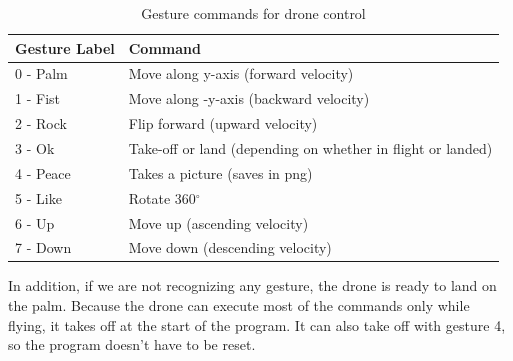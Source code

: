 \begin{table}[ht]
\centering
\begin{tabular}{ll}
\toprule
Gesture Label & Command \\
\midrule
0 - Palm& Move along y-axis (forward velocity) \\
1 - Fist& Move along -y-axis (backward velocity) \\
2 - Rock& Flip forward (upward velocity) \\
3 - Ok & Take-off or land (depending on whether in flight or landed) \\
4 - Peace& Takes a picture (saves in png) \\
5 - Like& Rotate 360$^\circ$ \\
6 - Up& Move up (ascending velocity) \\
7 - Down & Move down (descending velocity)\\
\bottomrule
\end{tabular}
\caption{Gesture commands for drone control}
\label{tab:gesture_commands}
\end{table}

In addition, if we are not recognizing any gesture, the drone is ready to land on the palm. Because the drone can execute most of the commands only while flying, it takes off at the start of the program. It can also take off with gesture 4, so the program doesn't have to be reset.


